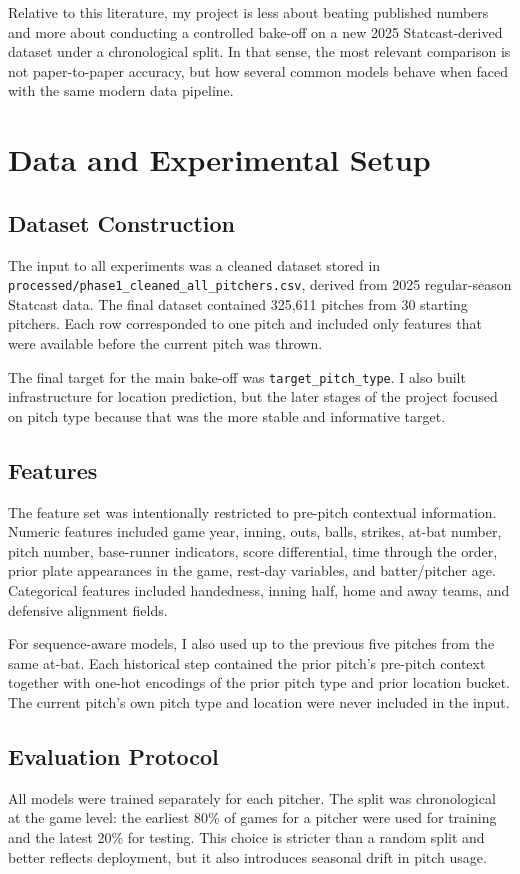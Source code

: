 \documentclass{article}
\begin{document}
Relative to this literature, my project is less about beating published numbers and more about conducting a controlled bake-off on a new 2025 Statcast-derived dataset under a chronological split. In that sense, the most relevant comparison is not paper-to-paper accuracy, but how several common models behave when faced with the same modern data pipeline.

\section{Data and Experimental Setup}
\subsection{Dataset Construction}
The input to all experiments was a cleaned dataset stored in \texttt{processed/phase1\_cleaned\_all\_pitchers.csv}, derived from 2025 regular-season Statcast data. The final dataset contained 325{,}611 pitches from 30 starting pitchers. Each row corresponded to one pitch and included only features that were available before the current pitch was thrown.

The final target for the main bake-off was \texttt{target\_pitch\_type}. I also built infrastructure for location prediction, but the later stages of the project focused on pitch type because that was the more stable and informative target.

\subsection{Features}
The feature set was intentionally restricted to pre-pitch contextual information. Numeric features included game year, inning, outs, balls, strikes, at-bat number, pitch number, base-runner indicators, score differential, time through the order, prior plate appearances in the game, rest-day variables, and batter/pitcher age. Categorical features included handedness, inning half, home and away teams, and defensive alignment fields.

For sequence-aware models, I also used up to the previous five pitches from the same at-bat. Each historical step contained the prior pitch's pre-pitch context together with one-hot encodings of the prior pitch type and prior location bucket. The current pitch's own pitch type and location were never included in the input.

\subsection{Evaluation Protocol}
All models were trained separately for each pitcher. The split was chronological at the game level: the earliest 80\% of games for a pitcher were used for training and the latest 20\% for testing. This choice is stricter than a random split and better reflects deployment, but it also introduces seasonal drift in pitch usage.
\end{document}
